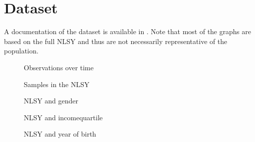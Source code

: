 \FloatBarrier\section{Dataset}
A documentation of the dataset is available in \cite{NLSY.2014}. Note that most of the graphs are based on the full NLSY and thus are not necessarily representative of the population.

\begin{figure}[htp]\centering
\caption{Observations over time}
\end{figure}

\begin{figure}[htp]\centering
\caption{Samples in the NLSY}
\end{figure}

\begin{figure}[htp]\centering
\caption{NLSY and gender}
\end{figure}

\begin{figure}[htp]\centering
\caption{NLSY and incomequartile}
\end{figure}

\begin{figure}[htp]\centering
\caption{NLSY and year of birth}
\end{figure}
